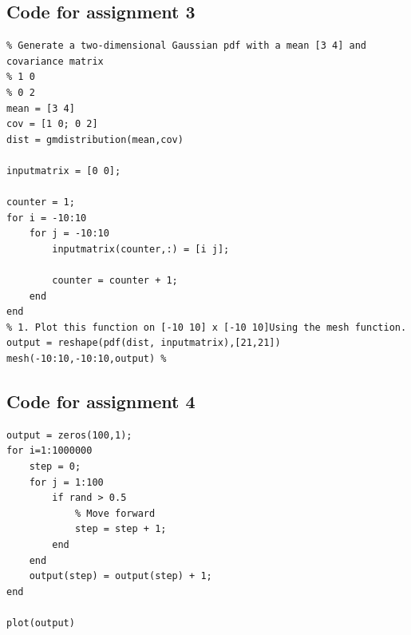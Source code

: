 \documentclass[10pt]{article}
\begin{document}
\subsection*{Code for assignment 3}
\begin{lstlisting}
% Generate a two-dimensional Gaussian pdf with a mean [3 4] and covariance matrix  
% 1 0
% 0 2
mean = [3 4]
cov = [1 0; 0 2]
dist = gmdistribution(mean,cov)

inputmatrix = [0 0];

counter = 1;
for i = -10:10
    for j = -10:10
        inputmatrix(counter,:) = [i j];
        
        counter = counter + 1;
    end
end
% 1. Plot this function on [-10 10] x [-10 10]Using the mesh function.
output = reshape(pdf(dist, inputmatrix),[21,21])
mesh(-10:10,-10:10,output) % 
\end{lstlisting}

\subsection*{Code for assignment 4}
\begin{lstlisting}
output = zeros(100,1);
for i=1:1000000
    step = 0;
    for j = 1:100
        if rand > 0.5
            % Move forward
            step = step + 1;
        end
    end
    output(step) = output(step) + 1;
end

plot(output)
\end{lstlisting}
\end{document}
